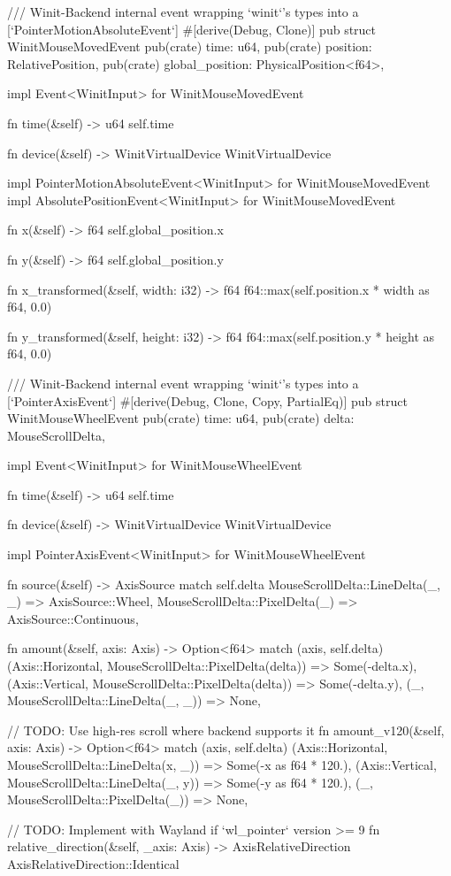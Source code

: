 /// Winit-Backend internal event wrapping `winit`'s types into a [`PointerMotionAbsoluteEvent`]
#[derive(Debug, Clone)]
pub struct WinitMouseMovedEvent {
    pub(crate) time: u64,
    pub(crate) position: RelativePosition,
    pub(crate) global_position: PhysicalPosition<f64>,
}

impl Event<WinitInput> for WinitMouseMovedEvent {
    fn time(&self) -> u64 {
        self.time
    }

    fn device(&self) -> WinitVirtualDevice {
        WinitVirtualDevice
    }
}

impl PointerMotionAbsoluteEvent<WinitInput> for WinitMouseMovedEvent {}
impl AbsolutePositionEvent<WinitInput> for WinitMouseMovedEvent {
    fn x(&self) -> f64 {
        self.global_position.x
    }

    fn y(&self) -> f64 {
        self.global_position.y
    }

    fn x_transformed(&self, width: i32) -> f64 {
        f64::max(self.position.x * width as f64, 0.0)
    }

    fn y_transformed(&self, height: i32) -> f64 {
        f64::max(self.position.y * height as f64, 0.0)
    }
}

/// Winit-Backend internal event wrapping `winit`'s types into a [`PointerAxisEvent`]
#[derive(Debug, Clone, Copy, PartialEq)]
pub struct WinitMouseWheelEvent {
    pub(crate) time: u64,
    pub(crate) delta: MouseScrollDelta,
}

impl Event<WinitInput> for WinitMouseWheelEvent {
    fn time(&self) -> u64 {
        self.time
    }

    fn device(&self) -> WinitVirtualDevice {
        WinitVirtualDevice
    }
}

impl PointerAxisEvent<WinitInput> for WinitMouseWheelEvent {
    fn source(&self) -> AxisSource {
        match self.delta {
            MouseScrollDelta::LineDelta(_, _) => AxisSource::Wheel,
            MouseScrollDelta::PixelDelta(_) => AxisSource::Continuous,
        }
    }

    fn amount(&self, axis: Axis) -> Option<f64> {
        match (axis, self.delta) {
            (Axis::Horizontal, MouseScrollDelta::PixelDelta(delta)) => Some(-delta.x),
            (Axis::Vertical, MouseScrollDelta::PixelDelta(delta)) => Some(-delta.y),
            (_, MouseScrollDelta::LineDelta(_, _)) => None,
        }
    }

    // TODO: Use high-res scroll where backend supports it
    fn amount_v120(&self, axis: Axis) -> Option<f64> {
        match (axis, self.delta) {
            (Axis::Horizontal, MouseScrollDelta::LineDelta(x, _)) => Some(-x as f64 * 120.),
            (Axis::Vertical, MouseScrollDelta::LineDelta(_, y)) => Some(-y as f64 * 120.),
            (_, MouseScrollDelta::PixelDelta(_)) => None,
        }
    }

    // TODO: Implement with Wayland if `wl_pointer` version >= 9
    fn relative_direction(&self, _axis: Axis) -> AxisRelativeDirection {
        AxisRelativeDirection::Identical
    }
}

